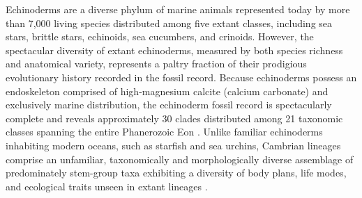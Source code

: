 \documentclass{article}
\begin{document}
Echinoderms are a diverse phylum of marine animals represented today by more than 7,000 living species \citep{brusca2003} distributed among five extant classes, including sea stars, brittle stars, echinoids, sea cucumbers, and crinoids. However, the spectacular diversity of extant echinoderms, measured by both species richness and anatomical variety, represents a paltry fraction of their prodigious evolutionary history recorded in the fossil record. Because echinoderms possess an endoskeleton comprised of high-magnesium calcite (calcium carbonate) and exclusively marine distribution, the echinoderm fossil record is spectacularly complete and reveals approximately 30 clades distributed among 21 taxonomic classes spanning the entire Phanerozoic Eon \citep{SprinkleKier1987, Sumrall1997, SumrallWaters2012, ZamoraRahman2014, WrightEtAl2017, SheffieldSumrall2019}. Unlike familiar echinoderms inhabiting modern oceans, such as starfish and sea urchins, Cambrian lineages comprise an unfamiliar, taxonomically and morphologically diverse assemblage of predominately stem-group taxa exhibiting a diversity of body plans, life modes, and ecological traits unseen in extant lineages \citep{Sprinkle1973, ZamoraEtAl2013, ZamoraRahman2014}.
\end{document}
